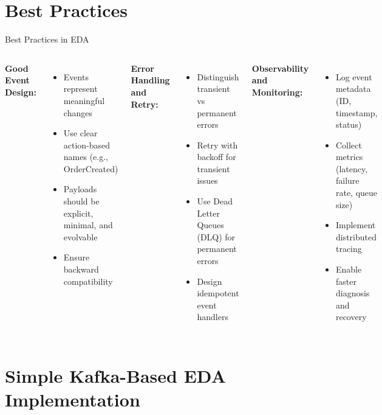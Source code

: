 \documentclass[aspectratio=169, table]{beamer}
\begin{document}
	
	\section{Best Practices}

	\begin{frame}[fragile]{Best Practices in EDA}
		\vspace{20pt}
		\begin{columns}[T]
			\textbf{Good Event Design:}
			\begin{itemize}
				\item Events represent meaningful changes
				\item Use clear action-based names (e.g., OrderCreated)
				\item Payloads should be explicit, minimal, and evolvable
				\item Ensure backward compatibility
			\end{itemize}
			
			\textbf{Error Handling and Retry:}
			\begin{itemize}
				\item Distinguish transient vs permanent errors
				\item Retry with backoff for transient issues
				\item Use Dead Letter Queues (DLQ) for permanent errors
				\item Design idempotent event handlers
			\end{itemize}
			
			\textbf{Observability and Monitoring:}
			\begin{itemize}
				\item Log event metadata (ID, timestamp, status)
				\item Collect metrics (latency, failure rate, queue size)
				\item Implement distributed tracing
				\item Enable faster diagnosis and recovery
			\end{itemize}
		\end{columns}
	\end{frame}
	
	
\section{Simple Kafka-Based EDA Implementation}
\end{document}
